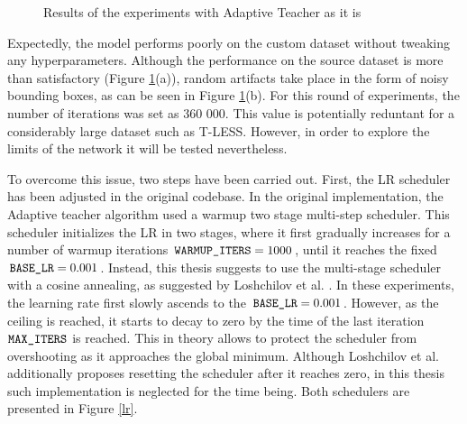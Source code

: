 \documentclass[english, 12pt, a4paper, elec, utf8, a-1b, online]{aaltothesis}
\begin{document}
\begin{figure}[htb]
    \centering
    \qquad
    \caption{Results of the experiments with Adaptive Teacher as it is}
    \label{adapt_experiment1}%
\end{figure}
\FloatBarrier

Expectedly, the model performs poorly on the custom dataset without tweaking any hyperparameters. Although the performance on the source dataset is more than satisfactory (Figure \ref{adapt_experiment1}(a)), random artifacts take place in the form of noisy bounding boxes, as can be seen in Figure \ref{adapt_experiment1}(b). For this round of experiments, the number of iterations was set as 360 000. This value is potentially reduntant for a considerably large dataset such as T-LESS.  However, in order to explore the limits of the network it will be tested nevertheless.  

To overcome this issue, two steps have been carried out. First, the LR scheduler has been adjusted in the original codebase. In the original implementation, the Adaptive teacher algorithm used a warmup two stage multi-step scheduler. This scheduler initializes the LR in two stages, where it first gradually increases for a number of warmup iterations $\texttt{WARMUP\textunderscore ITERS} = 1000$, until it reaches the fixed $\texttt{BASE\textunderscore LR} = 0.001$.  Instead, this thesis suggests to use the multi-stage scheduler with a cosine annealing, as suggested by Loshchilov et al. \cite{Loshchilov2016}. In these experiments, the learning rate first slowly ascends to the $\texttt{BASE\textunderscore LR} = 0.001$. However, as the ceiling is reached, it starts to decay to zero by the time of the last iteration $\texttt{MAX\textunderscore ITERS}$ is reached. This in theory allows to protect the scheduler from overshooting as it approaches the global minimum. Although Loshchilov et al. additionally proposes resetting the scheduler after it reaches zero, in this thesis such implementation is neglected for the time being. Both schedulers are presented in Figure \ref{lr}.  
\end{document}
